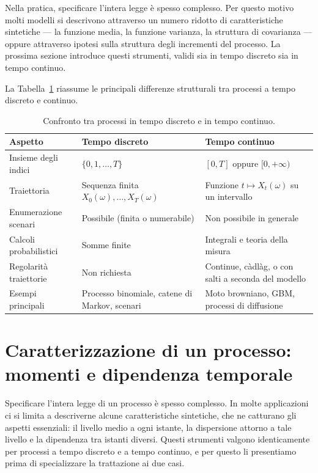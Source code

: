 Nella pratica, specificare l'intera legge \`{e} spesso complesso.
Per questo motivo molti modelli si descrivono attraverso un numero
ridotto di caratteristiche sintetiche --- la funzione media, la
funzione varianza, la struttura di covarianza --- oppure attraverso
ipotesi sulla struttura degli incrementi del processo. La prossima
sezione introduce questi strumenti, validi sia in tempo discreto sia
in tempo continuo.

La Tabella~\ref{tab:discreto-continuo} riassume le principali differenze
strutturali tra processi a tempo discreto e continuo.

\begin{table}[ht]
\centering
\begin{tabular}{|p{2.5cm}|p{4.2cm}|p{4.2cm}|}
\hline
\textbf{Aspetto} & \textbf{Tempo discreto} & \textbf{Tempo continuo}\\
\hline
Insieme \newline degli indici & $\{0,1,\ldots,T\}$ & $[0,T]$ oppure $[0,+\infty)$\\
\hline
Traiettoria & Sequenza finita  \newline 
$X_0(\omega),\ldots,X_T(\omega)$ & Funzione $t\mapsto X_t(\omega)$
su un intervallo\\
\hline
Enumerazione scenari & Possibile (finita o numerabile) &
Non possibile in generale\\
\hline
Calcoli \newline probabilistici & Somme finite & Integrali e teoria della
misura\\
\hline
Regolarit\`{a} \newline traiettorie & Non richiesta & Continue, c\`{a}dl\`{a}g,
o con salti a seconda del modello\\
\hline
Esempi \newline principali & Processo binomiale, catene di Markov,
scenari & Moto browniano, GBM, processi di diffusione\\
\hline
\end{tabular}
\caption{Confronto tra processi in tempo discreto e in tempo continuo.}
\label{tab:discreto-continuo}
\end{table}

\section{Caratterizzazione di un processo: momenti e dipendenza
temporale}
\label{sec:momenti}

Specificare l'intera legge di un processo \`{e} spesso complesso. In
molte applicazioni ci si limita a descriverne alcune caratteristiche
sintetiche, che ne catturano gli aspetti essenziali: il livello medio
a ogni istante, la dispersione attorno a tale livello e la dipendenza
tra istanti diversi. Questi strumenti valgono identicamente per
processi a tempo discreto e a tempo continuo, e per questo li
presentiamo prima di specializzare la trattazione ai due casi.

